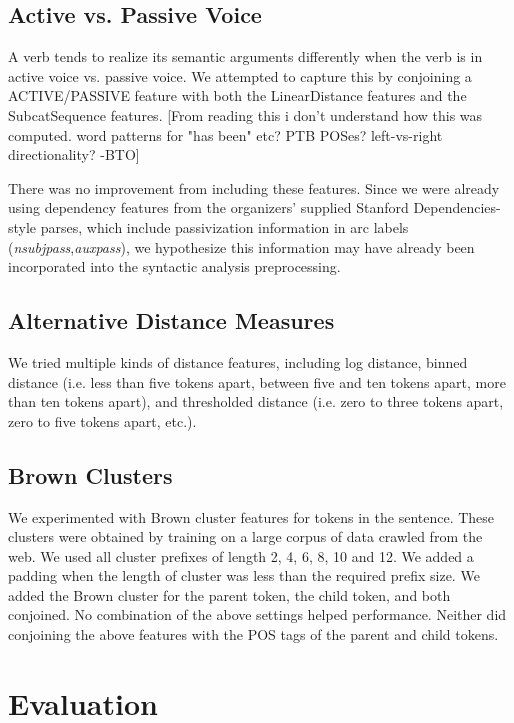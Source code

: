\documentclass[11pt]{article}
\newcommand{\bocomment}[1]{\textcolor{Bittersweet}{[#1 -BTO]}}
\begin{document}
\subsection{Active vs. Passive Voice}
A verb tends to realize its semantic arguments differently when the verb is in
active voice vs. passive voice.
We attempted to capture this by conjoining a ACTIVE/PASSIVE feature with both
the LinearDistance features and the SubcatSequence features.
\bocomment{From reading this i don't understand how this was computed. word patterns for "has been" etc? PTB POSes? left-vs-right directionality?}

There was no improvement from including these features.
Since we were already using dependency features from the 
organizers' supplied Stanford Dependencies-style parses,
which include passivization information in arc labels (\emph{nsubjpass},\emph{auxpass}),
we hypothesize this information may have already been incorporated into the syntactic analysis preprocessing.

\subsection{Alternative Distance Measures}
We tried multiple kinds of distance features, including log distance, binned
distance (i.e. less than five tokens apart, between five and ten tokens apart, more than
ten tokens apart), and thresholded distance (i.e. zero to three tokens apart,
zero to five tokens apart, etc.).

\subsection{Brown Clusters}
We experimented with Brown cluster features \cite{Brown:1992:CNG:176313.176316}
for tokens in the sentence.
These clusters were obtained by training on a large corpus of data crawled from
the web.
We used all cluster prefixes of length 2, 4, 6, 8, 10 and 12.
We added a padding when the length of cluster was less than the required prefix
size.
We added the Brown cluster for the parent token, the child token, and both
conjoined.
No combination of the above settings helped performance.
Neither did conjoining the above features with the POS tags of the parent and
child tokens.



\section{Evaluation}
\label{s:evaluation}
\end{document}
